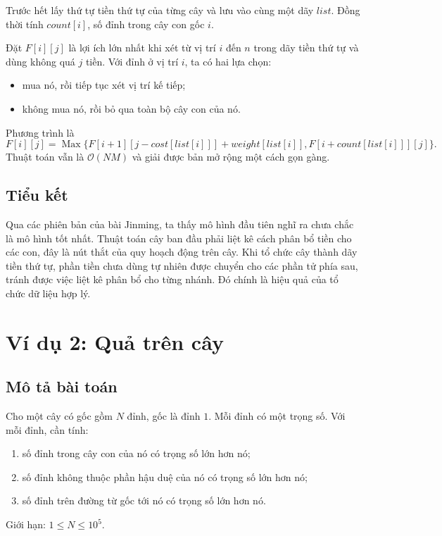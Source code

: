 \documentclass[11pt]{article}
\newcommand{\Oh}{\mathcal{O}}
\newcommand{\Max}{\operatorname{Max}}
\begin{document}
Trước hết lấy thứ tự tiền thứ tự của từng cây và lưu vào cùng một dãy
\(\mathit{list}\). Đồng thời tính \(\mathit{count}[i]\), số đỉnh trong cây con
gốc \(i\).

Đặt \(F[i][j]\) là lợi ích lớn nhất khi xét từ vị trí \(i\) đến \(n\) trong dãy
tiền thứ tự và dùng không quá \(j\) tiền. Với đỉnh ở vị trí \(i\), ta có hai
lựa chọn:
\begin{itemize}
  \item mua nó, rồi tiếp tục xét vị trí kế tiếp;
  \item không mua nó, rồi bỏ qua toàn bộ cây con của nó.
\end{itemize}
Phương trình là
\[
  F[i][j]=
  \Max\{
    F[i+1][j-\mathit{cost}[\mathit{list}[i]]]
      +\mathit{weight}[\mathit{list}[i]],
    F[i+\mathit{count}[\mathit{list}[i]]][j]
  \}.
\]
Thuật toán vẫn là \(\Oh(NM)\) và giải được bản mở rộng một cách gọn gàng.

\subsection*{Tiểu kết}

Qua các phiên bản của bài Jinming, ta thấy mô hình đầu tiên nghĩ ra chưa chắc
là mô hình tốt nhất. Thuật toán cây ban đầu phải liệt kê cách phân bổ tiền cho
các con, đây là nút thắt của quy hoạch động trên cây. Khi tổ chức cây thành
dãy tiền thứ tự, phần tiền chưa dùng tự nhiên được chuyển cho các phần tử phía
sau, tránh được việc liệt kê phân bổ cho từng nhánh. Đó chính là hiệu quả của
tổ chức dữ liệu hợp lý.

\section{Ví dụ 2: Quả trên cây}

\subsection*{Mô tả bài toán}

Cho một cây có gốc gồm \(N\) đỉnh, gốc là đỉnh \(1\). Mỗi đỉnh có một trọng số.
Với mỗi đỉnh, cần tính:
\begin{enumerate}
  \item số đỉnh trong cây con của nó có trọng số lớn hơn nó;
  \item số đỉnh không thuộc phần hậu duệ của nó có trọng số lớn hơn nó;
  \item số đỉnh trên đường từ gốc tới nó có trọng số lớn hơn nó.
\end{enumerate}
Giới hạn: \(1\le N\le 10^5\).
\end{document}
